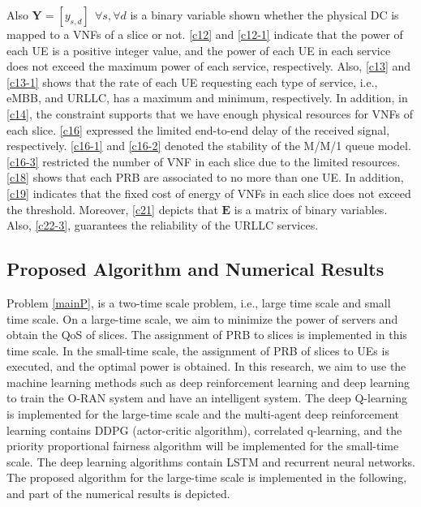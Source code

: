 \documentclass[conference]{IEEEtran}
\begin{document}
Also $\boldsymbol{Y} =[y_{s,d}]  \:\: \forall s ,  \forall d $ is a binary variable shown whether
the physical DC is mapped to a VNFs of a slice or not.
\eqref{c12} and \eqref{c12-1} indicate that the power of each UE is a positive integer value, and the power of each UE in each service does not exceed the maximum power of each service, respectively.  
Also, \eqref{c13} and \eqref{c13-1} shows that the rate of each UE requesting each type of service, i.e., eMBB, and URLLC, has a maximum and minimum, respectively.
In addition, in \eqref{c14}, the constraint supports that we have enough physical resources for VNFs of each slice.
\eqref{c16} expressed the limited end-to-end delay of the received signal, respectively.
\eqref{c16-1} and \eqref{c16-2} denoted the stability of the M/M/1 queue model.
\eqref{c16-3} restricted the number of VNF in each slice due to the limited resources.
\eqref{c18} shows that each PRB are associated to no more than one UE.
In addition, \eqref{c19} indicates that the fixed cost of energy of VNFs in each slice does not exceed the threshold. 
Moreover, \eqref{c21} depicts that $\boldsymbol{E}$ is a matrix of binary variables.
Also, \eqref{c22-3}, guarantees the reliability of the URLLC services.
\subsection{Proposed Algorithm and Numerical Results}
Problem \eqref{mainP}, is a two-time scale problem, i.e., large time scale and small time scale. On a large-time scale, we aim to minimize the power of servers and obtain the QoS of slices. The assignment of PRB to slices is implemented in this time scale. In the small-time scale, the assignment of PRB of slices to UEs is executed, and the optimal power is obtained.
In this research, we aim to use the machine learning methods such as deep reinforcement learning and deep learning to train the O-RAN system and have an intelligent system.
The deep Q-learning is implemented for the large-time scale and 
 the multi-agent deep reinforcement learning contains DDPG (actor-critic algorithm), correlated q-learning, and the priority proportional fairness algorithm will be implemented for the small-time scale. 
The deep learning algorithms contain LSTM and recurrent neural networks.
The proposed algorithm for the large-time scale is implemented in the following, and part of the numerical results is depicted.
\end{document}
